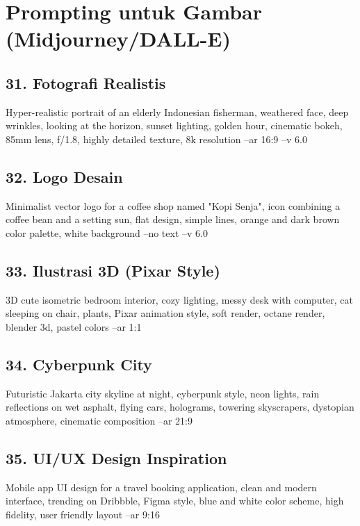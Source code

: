 \section{Prompting untuk Gambar (Midjourney/DALL-E)}

\subsection{31. Fotografi Realistis}
\begin{promptbox}
Hyper-realistic portrait of an elderly Indonesian fisherman, weathered face, deep wrinkles, looking at the horizon, sunset lighting, golden hour, cinematic bokeh, 85mm lens, f/1.8, highly detailed texture, 8k resolution --ar 16:9 --v 6.0
\end{promptbox}

\subsection{32. Logo Desain}
\begin{promptbox}
Minimalist vector logo for a coffee shop named "Kopi Senja", icon combining a coffee bean and a setting sun, flat design, simple lines, orange and dark brown color palette, white background --no text --v 6.0
\end{promptbox}

\subsection{33. Ilustrasi 3D (Pixar Style)}
\begin{promptbox}
3D cute isometric bedroom interior, cozy lighting, messy desk with computer, cat sleeping on chair, plants, Pixar animation style, soft render, octane render, blender 3d, pastel colors --ar 1:1
\end{promptbox}

\subsection{34. Cyberpunk City}
\begin{promptbox}
Futuristic Jakarta city skyline at night, cyberpunk style, neon lights, rain reflections on wet asphalt, flying cars, holograms, towering skyscrapers, dystopian atmosphere, cinematic composition --ar 21:9
\end{promptbox}

\subsection{35. UI/UX Design Inspiration}
\begin{promptbox}
Mobile app UI design for a travel booking application, clean and modern interface, trending on Dribbble, Figma style, blue and white color scheme, high fidelity, user friendly layout --ar 9:16
\end{promptbox}

